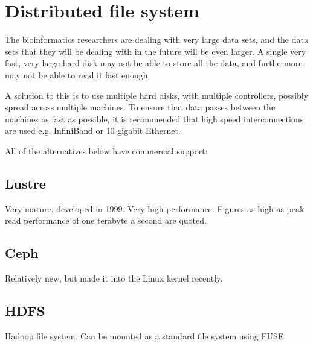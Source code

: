 \documentclass{amsart}
\begin{document}
\section{Distributed file system}
The bioinformatics researchers are dealing with very large data sets, and the data
sets that they will be dealing with in the future will be even larger. A single very
fast, very large hard disk may not be able to store all the data, and furthermore may
not be able to read it fast enough.

A solution to this is to use multiple hard disks, with multiple controllers, possibly
spread across multiple machines. To ensure that data passes between the machines as
fast as possible, it is recommended that high speed interconnections are used e.g.
InfiniBand or 10 gigabit Ethernet.

All of the alternatives below have commercial support:

\subsection{Lustre}
Very mature, developed in 1999. Very high performance. Figures as high as
peak read performance of one terabyte a second are quoted.
\subsection{Ceph}
Relatively new, but made it into the Linux kernel recently.
\subsection{HDFS}
Hadoop file system. Can be mounted as a standard file system using FUSE.
\end{document}
